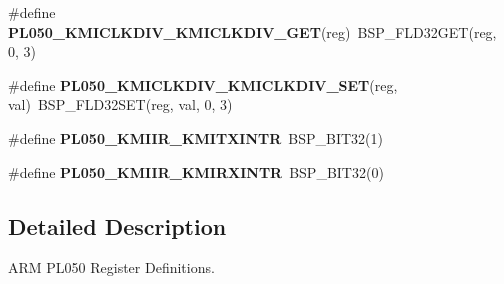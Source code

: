 \begin{DoxyCompactItemize}
\#define {\bfseries P\+L050\+\_\+\+K\+M\+I\+C\+L\+K\+D\+I\+V\+\_\+\+K\+M\+I\+C\+L\+K\+D\+I\+V\+\_\+\+G\+ET}(reg)~B\+S\+P\+\_\+\+F\+L\+D32\+G\+ET(reg, 0, 3)
\item 
\mbox{\label{arm-pl050-regs_8h_a077939b8794e5144cae1c8da01cdbce3}} 
\#define {\bfseries P\+L050\+\_\+\+K\+M\+I\+C\+L\+K\+D\+I\+V\+\_\+\+K\+M\+I\+C\+L\+K\+D\+I\+V\+\_\+\+S\+ET}(reg,  val)~B\+S\+P\+\_\+\+F\+L\+D32\+S\+ET(reg, val, 0, 3)
\item 
\mbox{\label{arm-pl050-regs_8h_aa177ac5c74c460ddb7e5c4a086e35590}} 
\#define {\bfseries P\+L050\+\_\+\+K\+M\+I\+I\+R\+\_\+\+K\+M\+I\+T\+X\+I\+N\+TR}~B\+S\+P\+\_\+\+B\+I\+T32(1)
\item 
\mbox{\label{arm-pl050-regs_8h_a83e5907f45873fb5c9580b84e5464ac2}} 
\#define {\bfseries P\+L050\+\_\+\+K\+M\+I\+I\+R\+\_\+\+K\+M\+I\+R\+X\+I\+N\+TR}~B\+S\+P\+\_\+\+B\+I\+T32(0)
\end{DoxyCompactItemize}


\subsection{Detailed Description}
A\+RM P\+L050 Register Definitions. 

